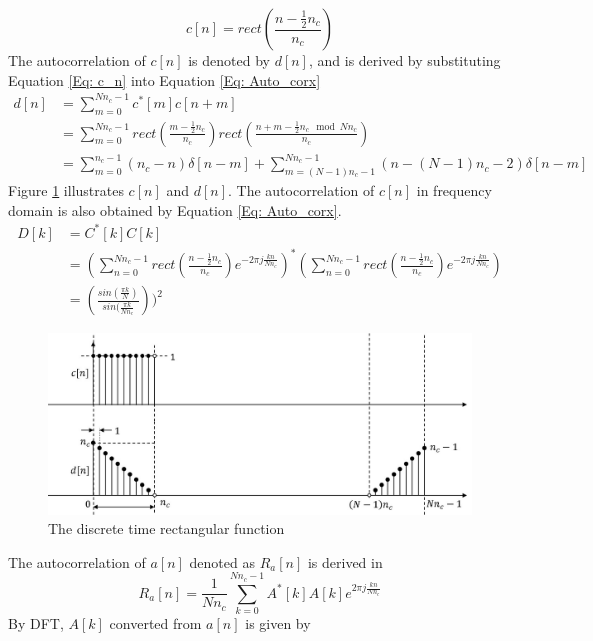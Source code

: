 \documentclass[draftcls,onecolumn]{IEEEtran}  %
\begin{document}
\begin{equation}\label{Eq: c_n}
c[n] = rect(\frac{n-\frac{1}{2} n_c}{n_c})
\end{equation}
The autocorrelation of $c[n]$ is denoted by $d[n]$, and is derived by substituting Equation \ref{Eq: c_n} into Equation \ref{Eq: Auto_corx}
\begin{equation}\label{Eq: d_n}
\begin{split}
d[n] &= \sum\limits_{m=0}^{Nn_c-1} c^*[m] c[n+m] \\
	 &= \sum\limits_{m=0}^{Nn_c-1} rect(\frac{m-\frac{1}{2} n_c}{n_c}) rect(\frac{n+m-\frac{1}{2} n_c \mod Nn_c}{n_c}) \\
     &= \sum\limits_{m=0}^{n_c-1} (n_c-n)\delta[n-m] + 
        \sum\limits_{m=(N-1)n_c-1}^{Nn_c-1} (n-(N-1)n_c-2)\delta[n-m] 
\end{split}
\end{equation}
Figure \ref{fig:c_n_d_n} illustrates $c[n]$ and $d[n]$. The autocorrelation of $c[n]$ in frequency domain is also obtained by Equation \ref{Eq: Auto_corx}.
\begin{equation}\label{Eq: D_k}
\begin{split}
D[k] &= C^*[k] C[k] \\
	 &= (\sum\limits_{n=0}^{Nn_c-1} rect(\frac{n-\frac{1}{2} n_c}{n_c}) e^{-2\pi j \frac{kn}{Nn_c}})^* 
     (\sum\limits_{n=0}^{Nn_c-1} rect(\frac{n-\frac{1}{2} n_c}{n_c}) e^{-2\pi j \frac{kn}{Nn_c}} ) \\
     &= (\frac{ sin(\frac{\pi k}{N})}{sin(\frac{\pi k}{N n_c}}))^2
\end{split}
\end{equation}
\begin{figure}[t!]
	\centering
	\includegraphics[width=3 in]{pdf/rect_auto.jpg}
	\caption{The discrete time rectangular function}
	\label{fig:c_n_d_n}
\end{figure}
The autocorrelation of $a[n]$ denoted as $R_a[n]$ is derived in 
\begin{equation}\label{Eq: Ra_n}
R_a[n] = \frac{1}{Nn_c}\sum\limits_{k=0}^{Nn_c-1} A^*[k]A[k] e^{2\pi j \frac{kn}{Nn_c}}
\end{equation}
By DFT, $A[k]$ converted from $a[n]$ is given by
\end{document}
